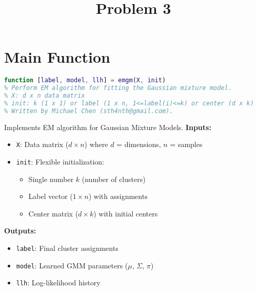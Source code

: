 \documentclass[11pt]{article}
\title{Problem 3}
\author{}
\date{}
\begin{document}
\maketitle

\newenvironment{codeexplain}[1][\linewidth]{%
    \begin{minipage}{#1}
    \begin{minipage}[t]{0.48\linewidth}
}{%
    \end{minipage}
    \end{minipage}
}

\section{Main Function}

\begin{minipage}{\textwidth}
\begin{minipage}[t]{0.48\textwidth}
\begin{lstlisting}[language=Matlab, firstnumber=1]
function [label, model, llh] = emgm(X, init)
% Perform EM algorithm for fitting the Gaussian mixture model.
% X: d x n data matrix
% init: k (1 x 1) or label (1 x n, 1<=label(i)<=k) or center (d x k)
% Written by Michael Chen (sth4nth@gmail.com).
\end{lstlisting}
\end{minipage}
\hfill
\begin{minipage}[t]{0.48\textwidth}
Implements EM algorithm for Gaussian Mixture Models.
\textbf{Inputs:}
\begin{itemize}
\item \texttt{X}: Data matrix ($d \times n$) where $d$ = dimensions, $n$ = samples
\item \texttt{init}: Flexible initialization:
    \begin{itemize}
    \item Single number $k$ (number of clusters)
    \item Label vector ($1 \times n$) with assignments
    \item Center matrix ($d \times k$) with initial centers
    \end{itemize}
\end{itemize}
\textbf{Outputs:}
\begin{itemize}
\item \texttt{label}: Final cluster assignments
\item \texttt{model}: Learned GMM parameters ($\mu$, $\Sigma$, $\pi$)
\item \texttt{llh}: Log-likelihood history
\end{itemize}
\end{minipage}
\end{minipage}
\end{document}
